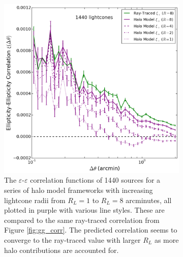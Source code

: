 \documentclass[%
 reprint,
 amsmath,amssymb,
 aps,nofootinbib
]{revtex4-1}
\begin{document}
\begin{figure}
\begin{subfigure}{0.475\textwidth}
        \includegraphics[width=\textwidth]{figs-swe/thesis/gg_progression.png}
        \captionsetup{justification=raggedright,singlelinecheck=false}
        \caption{The $\varepsilon$-$\varepsilon$ correlation functions of 1440 sources for a series of halo model frameworks with increasing lightcone radii from $R_L=1$ to $R_L=8$ arcminutes, all plotted in purple with various line styles. These are compared to the same ray-traced correlation from Figure \ref{fig:gg_corr}. The predicted correlation seems to converge to the ray-traced value with larger $R_L$ as more halo contributions are accounted for.}
        \label{fig:gg_corr_series}
    \end{subfigure}
    \caption{}
\end{figure}
\end{document}
